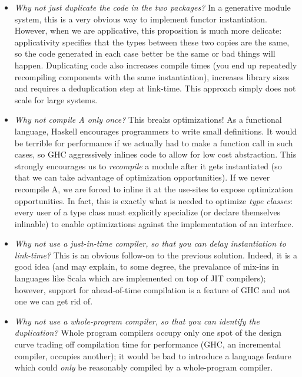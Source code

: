 \begin{itemize}

    \item \emph{Why not just duplicate the code in the two packages?} In
    a generative module system, this is a very obvious way to implement
    functor instantiation.  However, when we are applicative, this
    proposition is much more delicate: applicativity specifies that the
    types between these two copies are the same, so the code generated
    in each case better be the same or bad things will happen.
    Duplicating code also increases compile times (you end up repeatedly
    recompiling components with the same instantiation), increases
    library sizes and requires a deduplication step at link-time.  This
    approach simply does not scale for large systems.

    \item \emph{Why not compile A only once?}  This breaks
    optimizations!  As a functional language, Haskell encourages
    programmers to write small definitions.  It would be terrible for
    performance if we actually had to make a function call in such
    cases, so GHC aggressively inlines code to allow for low cost
    abstraction.  This strongly encourages us to \emph{recompile} a
    module after it gets instantiated (so that we can take advantage of
    optimization opportunities).  If we never recompile A, we are forced
    to inline it at the use-sites to expose optimization opportunities.
    In fact, this is exactly what is needed to optimize \emph{type
    classes}: every user of a type class must explicitly specialize (or
    declare themselves inlinable) to enable optimizations against the
    implementation of an interface. 

    \item \emph{Why not use a just-in-time compiler, so that you can
    delay instantiation to link-time?}  This is an obvious follow-on
    to the previous solution.  Indeed, it is a good idea (and may
    explain, to some degree, the prevalance of mix-ins in languages like
    Scala which are implemented on top of JIT compilers); however,
    support for ahead-of-time compilation is a feature of GHC and not
    one we can get rid of.

    \item \emph{Why not use a whole-program compiler, so that you can
    identify the duplication?}  Whole program
    compilers occupy only one spot of the design curve trading off
    compilation time for performance (GHC, an incremental compiler,
    occupies another); it would be bad to introduce a language feature
    which could \emph{only} be reasonably compiled by a whole-program
    compiler.

\end{itemize}

